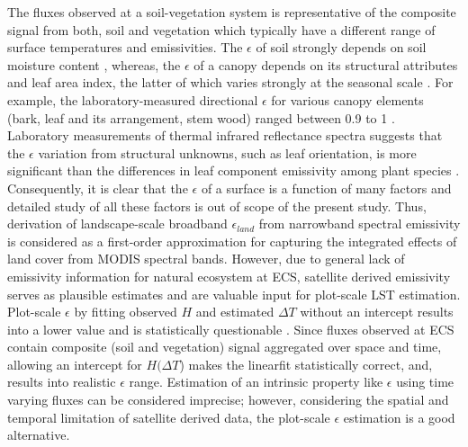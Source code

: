 \documentclass[fleqn,10pt]{wlscirep}
\begin{document}
{The fluxes observed at a soil-vegetation system is representative of the composite signal from both, soil and vegetation which typically have a different range of surface temperatures and emissivities\cite{jin_improved_2006-1}. The $\epsilon$ of soil strongly depends on soil moisture content \cite{mira2007influence}, whereas, the $\epsilon$ of a canopy depends on its structural attributes and leaf area index, the latter of which varies strongly at the seasonal scale \cite{chen2015determining}. For example, the laboratory-measured directional $\epsilon$ for various canopy elements (bark, leaf and its arrangement, stem wood) ranged between 0.9 to 1 \cite{vishnevetsky2019method}. %
Laboratory measurements of thermal infrared reflectance spectra suggests that the $\epsilon$ variation from structural unknowns, such as leaf orientation, is more significant than the differences in leaf component emissivity among plant species \cite{snyder1998classification}. Consequently, it is clear that the $\epsilon$ of a surface is a function of many factors and detailed study of all these factors is out of scope of the present study. Thus, derivation of landscape-scale broadband $\epsilon_{land}$ from narrowband spectral emissivity is considered as a first-order approximation for capturing the integrated effects of land cover from MODIS spectral bands\cite{jin_improved_2006-1}. However, due to general lack of emissivity information for natural ecosystem at ECS, satellite derived emissivity serves as plausible estimates and are valuable input for plot-scale LST estimation. Plot-scale $\epsilon$ by fitting observed $H$ and estimated $\Delta T$ without an intercept results into a lower value and is statistically questionable \cite{eisenhauer2003regression}. Since fluxes observed at ECS contain composite (soil and vegetation) signal aggregated over space and time, allowing an intercept for $H(\Delta T$) makes the linearfit statistically correct, and, results into realistic $\epsilon$ range. Estimation of an intrinsic property like $\epsilon$ using time varying fluxes can be considered imprecise; however, considering the spatial and temporal limitation of satellite derived data, the plot-scale $\epsilon$ estimation is a good alternative.

}
\end{document}
